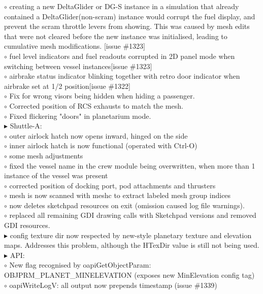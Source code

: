 \documentclass[Orbiter User Manual.tex]{subfiles}
\begin{document}
$\circ$ creating a new DeltaGlider or DG-S instance in a simulation that already contained a DeltaGlider(non-scram) instance would corrupt the fuel display, and prevent the scram throttle levers from showing. This was caused by mesh edits that were not cleared before the new instance was initialised, leading to cumulative mesh modifications. [issue \#1323]\\
$\circ$ fuel level indicators and fuel readouts corrupted in 2D panel mode when switching between vessel instances[issue \#1323]\\
$\circ$ airbrake status indicator blinking together with retro door indicator when airbrake set at 1/2 position[issue \#1322]\\
$\circ$ Fix for wrong visors being hidden when hiding a passenger.\\
$\circ$ Corrected position of RCS exhausts to match the mesh.\\
$\circ$ Fixed flickering "doors" in planetarium mode.\\
$\blacktriangleright$ Shuttle-A:\\
$\circ$ outer airlock hatch now opens inward, hinged on the side\\
$\circ$ inner airlock hatch is now functional (operated with Ctrl-O)\\
$\circ$ some mesh adjustments\\
$\circ$ fixed the vessel name in the crew module being overwritten, when more than 1 instance of the vessel was present\\
$\circ$ corrected position of docking port, pod attachments and thrusters\\
$\circ$ mesh is now scanned with meshc to extract labeled mesh group indices\\
$\circ$ now deletes sketchpad resources on exit (omission caused log file warnings).\\
$\circ$ replaced all remaining GDI drawing calls with Sketchpad versions and removed GDI resources.\\
$\blacktriangleright$ config texture dir now respected by new-style planetary texture and elevation maps. Addresses this problem, although the HTexDir value is still not being used.\\
$\blacktriangleright$ API:\\
$\circ$ New flag recognised by oapiGetObjectParam: OBJPRM\_PLANET\_MINELEVATION (exposes new MinElevation config tag)\\
$\circ$ oapiWriteLogV: all output now prepends timestamp (issue \#1339)\\
\end{document}
